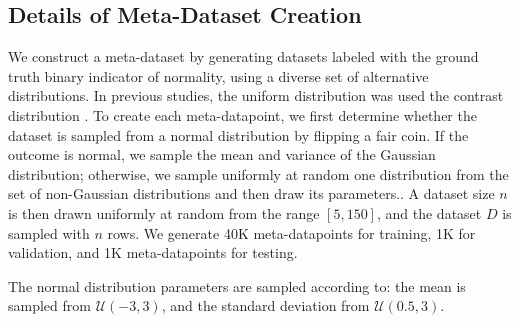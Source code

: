 \subsection{Details of Meta-Dataset Creation}
We construct a meta-dataset by generating datasets labeled with the ground truth binary indicator of normality, using a diverse set of alternative distributions. In previous studies, the uniform distribution was used the contrast distribution \citet{razali2011power}. To create each meta-datapoint, we first determine whether the dataset is sampled from a normal distribution by flipping a fair coin. If the outcome is normal, we sample the mean and variance of the Gaussian distribution; otherwise, we sample uniformly at random one distribution from the set of non-Gaussian distributions and then draw its parameters.. A dataset size \( n \) is then drawn uniformly at random from the range \( [5, 150] \), and the dataset \( D \) is sampled with \( n \) rows. We generate 40K meta-datapoints for training, 1K for validation, and 1K meta-datapoints for testing.

The normal distribution parameters are sampled according to: the mean is sampled from $\mathcal{U}(-3, 3)$, and the standard deviation from $\mathcal{U}(0.5, 3)$.

